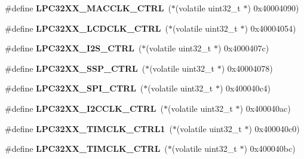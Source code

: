 \begin{DoxyCompactItemize}
\item 
\mbox{\label{group__lpc32xx__reg_ga252cadf17211033b9aa756cead0b8181}} 
\#define {\bfseries L\+P\+C32\+X\+X\+\_\+\+M\+A\+C\+C\+L\+K\+\_\+\+C\+T\+RL}~($\ast$(volatile uint32\+\_\+t $\ast$) 0x40004090)
\item 
\mbox{\label{group__lpc32xx__reg_gadff629d86e0ae9ff8d1fc1cea71d6c5e}} 
\#define {\bfseries L\+P\+C32\+X\+X\+\_\+\+L\+C\+D\+C\+L\+K\+\_\+\+C\+T\+RL}~($\ast$(volatile uint32\+\_\+t $\ast$) 0x40004054)
\item 
\mbox{\label{group__lpc32xx__reg_ga71b636b84f0b2c482e130546477bacc7}} 
\#define {\bfseries L\+P\+C32\+X\+X\+\_\+\+I2\+S\+\_\+\+C\+T\+RL}~($\ast$(volatile uint32\+\_\+t $\ast$) 0x4000407c)
\item 
\mbox{\label{group__lpc32xx__reg_ga9fde3e9ca592aa5d15a8f6f3ab916780}} 
\#define {\bfseries L\+P\+C32\+X\+X\+\_\+\+S\+S\+P\+\_\+\+C\+T\+RL}~($\ast$(volatile uint32\+\_\+t $\ast$) 0x40004078)
\item 
\mbox{\label{group__lpc32xx__reg_ga6d4616379614023372af6b27d4c4abe5}} 
\#define {\bfseries L\+P\+C32\+X\+X\+\_\+\+S\+P\+I\+\_\+\+C\+T\+RL}~($\ast$(volatile uint32\+\_\+t $\ast$) 0x400040c4)
\item 
\mbox{\label{group__lpc32xx__reg_ga1703bfbaf03f6bbd4a7d12cb1fcf3dd5}} 
\#define {\bfseries L\+P\+C32\+X\+X\+\_\+\+I2\+C\+C\+L\+K\+\_\+\+C\+T\+RL}~($\ast$(volatile uint32\+\_\+t $\ast$) 0x400040ac)
\item 
\mbox{\label{group__lpc32xx__reg_gaaac720620bb1a0da45bfc91fa72907e8}} 
\#define {\bfseries L\+P\+C32\+X\+X\+\_\+\+T\+I\+M\+C\+L\+K\+\_\+\+C\+T\+R\+L1}~($\ast$(volatile uint32\+\_\+t $\ast$) 0x400040c0)
\item 
\mbox{\label{group__lpc32xx__reg_gaf17f7203e0e42544106f5ec2ec2f575a}} 
\#define {\bfseries L\+P\+C32\+X\+X\+\_\+\+T\+I\+M\+C\+L\+K\+\_\+\+C\+T\+RL}~($\ast$(volatile uint32\+\_\+t $\ast$) 0x400040bc)
\item 
\mbox{\label{group__lpc32xx__reg_ga604a870945ae8352ee730a9a7b0b8cee}} 

\end{DoxyCompactItemize}
